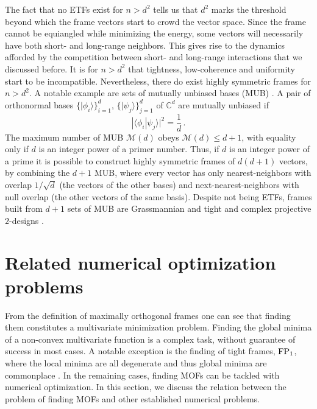 \documentclass[%
superscriptaddress,
amsmath,amssymb,
 aps,
pra,
floatfix,
]{revtex4-2}
\begin{document}
The fact that no ETFs exist for $n > d^2$ tells us that $d^2$ marks the threshold beyond which the frame vectors start to crowd the vector space. Since the frame cannot be equiangled while minimizing the energy, some vectors will necessarily have both short- and long-range neighbors. This gives rise to the dynamics afforded by the competition between short- and long-range interactions that we discussed before. It is for $n > d^2$ that tightness, low-coherence and uniformity start to be incompatible. Nevertheless, there do exist highly symmetric frames for $n>d^2$. A notable example are sets of mutually unbiased bases (MUB) \cite{schwinger1960unitary, ivonovic1981geometrical}. A pair of orthonormal bases $\{|\phi_i\rangle\}_{i=1}^d$, $\{|\psi_j\rangle\}_{j=1}^d$ of $\mathbb C^d$ are mutually unbiased if 
%
\begin{equation}
    |\langle \phi_i | \psi_j \rangle|^2 = \frac{1}{d} \,.
\end{equation}
%
The maximum number of MUB $\mathcal M(d)$ obeys $\mathcal M(d) \leq d+1$, with equality only if $d$ is an integer power of a primer number. Thus, if $d$ is an integer power of a prime it is possible to construct highly symmetric frames of $d(d+1)$ vectors, by combining the $d+1$ MUB, where every vector has only nearest-neighbors with overlap $1/\sqrt{d}$ (the vectors of the other bases) and next-nearest-neighbors  with null overlap (the other vectors of the same basis). Despite not being ETFs, frames built from $d+1$ sets of MUB are Grassmannian and tight \cite{jasper2019game} and complex projective $2$-designs \cite{klappenecker2005mutually}. 

\section{Related numerical optimization problems}

\label{predecesors}

From the definition of maximally orthogonal frames one can see that finding them constitutes a multivariate minimization problem. Finding the global minima of a non-convex multivariate function is a complex task, without guarantee of success in most cases. A notable exception is the finding of tight frames, ${\rm FP}_1$, where the local minima are all degenerate and thus global minima are commonplace \cite{benedetto2003finite}. In the remaining cases, finding MOFs can be tackled with numerical optimization. In this section, we discuss the relation between the problem of finding MOFs and other established numerical problems.
  
\end{document}
